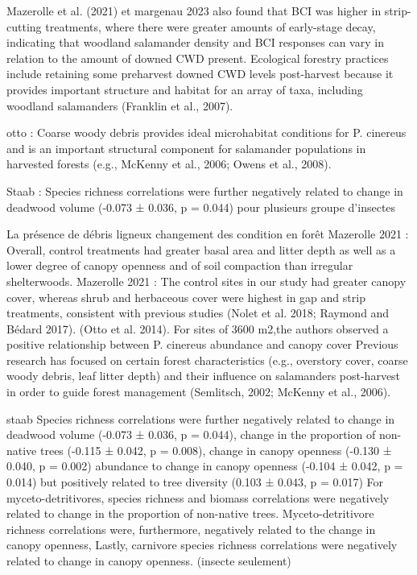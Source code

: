 Mazerolle et al. (2021)  et margenau 2023 also found that BCI was higher in strip-cutting treatments, where there were greater amounts of early-stage decay, indicating that woodland salamander density and BCI responses can vary in relation to the amount of downed CWD present.
Ecological forestry practices include retaining some preharvest downed CWD levels post-harvest because it provides important structure and habitat for an array of taxa, including woodland salamanders (Franklin et al., 2007).

otto :
Coarse woody debris provides ideal microhabitat conditions for P. cinereus and is an important structural component for salamander populations in harvested forests (e.g., McKenny et al., 2006; Owens et al., 2008).

Staab :
Species richness correlations were further negatively related to change in deadwood volume (-0.073 ± 0.036, p = 0.044) pour plusieurs groupe d'insectes

La présence de débris ligneux 
changement des condition en forêt
Mazerolle 2021 : Overall, control treatments had greater basal area and litter depth as well as a lower degree of canopy openness and of soil compaction than irregular shelterwoods.
Mazerolle 2021 : The control sites in our study had greater canopy cover, whereas shrub and herbaceous cover were highest in gap and strip treatments, consistent with previous studies (Nolet et al. 2018; Raymond and Bédard 2017).
(Otto et al. 2014). For sites of 3600 m2,the authors observed a positive relationship between P. cinereus abundance and canopy cover 
Previous research has focused on certain forest characteristics (e.g., overstory cover, coarse woody debris, leaf litter depth) and their influence on salamanders post-harvest in order to guide forest management (Semlitsch, 2002; McKenny et al., 2006).

staab
Species richness correlations were further negatively related to change in deadwood volume (-0.073 ± 0.036, p = 0.044), change in the proportion of non-native trees (-0.115 ± 0.042, p = 0.008), change in canopy openness (-0.130 ± 0.040, p = 0.002)
abundance to change in canopy openness (-0.104 ± 0.042, p = 0.014) but positively related to tree diversity (0.103 ± 0.043, p = 0.017)
For myceto-detritivores, species richness and biomass correlations were negatively related to change in the proportion of non-native trees. Myceto-detritivore richness correlations were, furthermore, negatively related to the change in canopy openness,
Lastly, carnivore species richness correlations were negatively related to change in canopy openness. (insecte seulement)

